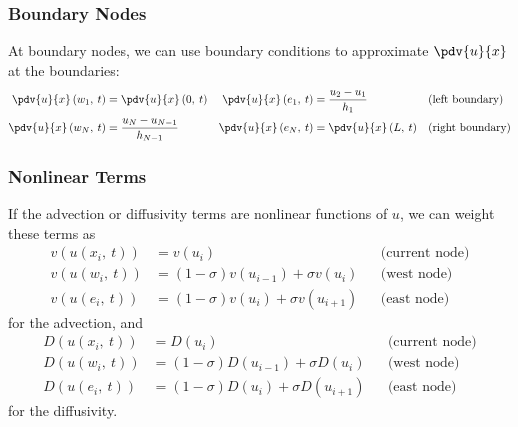 \documentclass{article}
\begin{document}
\subsubsection{Boundary Nodes}
At boundary nodes, we can use boundary conditions to approximate
\(\pdv{u}{x}\) at the boundaries:
\begin{align*}
    \pdv{u}{x}\left( w_1,\: t \right) & = \pdv{u}{x}\left( 0,\: t \right) & \pdv{u}{x}\left( e_1,\: t \right) & = \frac{u_2 - u_1}{h_1}           &  & \text{(left boundary)}  \\
    \pdv{u}{x}\left( w_N,\: t \right) & = \frac{u_N - u_{N-1}}{h_{N-1}}   & \pdv{u}{x}\left( e_N,\: t \right) & = \pdv{u}{x}\left( L,\: t \right) &  & \text{(right boundary)}
\end{align*}
\subsubsection{Nonlinear Terms}
If the advection or diffusivity terms are nonlinear functions of \(u\),
we can weight these terms as
\begin{align*}
    v\left( u\left( x_i,\: t \right) \right) & = v\left( u_i \right)                                     &  & \text{(current node)} \\
    v\left( u\left( w_i,\: t \right) \right) & = \left( 1 - \sigma \right) v\left( u_{i-1} \right) + \sigma v\left( u_i \right) &  & \text{(west node)}    \\
    v\left( u\left( e_i,\: t \right) \right) & = \left( 1 - \sigma \right) v\left( u_i \right) + \sigma v\left( u_{i+1} \right) &  & \text{(east node)}
\end{align*}
for the advection, and
\begin{align*}
    D\left( u\left( x_i,\: t \right) \right) & = D\left( u_i \right)                                     &  & \text{(current node)} \\
    D\left( u\left( w_i,\: t \right) \right) & = \left( 1 - \sigma \right) D\left( u_{i-1} \right) + \sigma D\left( u_i \right) &  & \text{(west node)}    \\
    D\left( u\left( e_i,\: t \right) \right) & = \left( 1 - \sigma \right) D\left( u_i \right) + \sigma D\left( u_{i+1} \right) &  & \text{(east node)}
\end{align*}
for the diffusivity.
\end{document}
